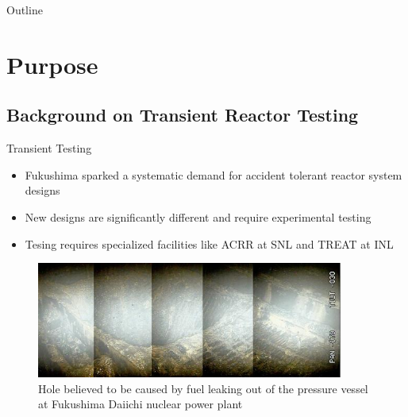 \documentclass[8pt,xcolor=dvipnames]{beamer}
\begin{document}
\begin{frame}{Outline}
\begin{multicols}{2}
\tableofcontents 
\end{multicols}
\end{frame}

\section{Purpose}

\subsection{Background on Transient Reactor Testing}

\begin{frame}{Transient Testing}

\begin{block}{}
\begin{itemize}
\item Fukushima sparked a systematic demand for accident tolerant reactor system designs
\item New designs are significantly different and require experimental testing 
\item Tesing requires specialized facilities like ACRR at SNL and TREAT at INL
\end{itemize}
\end{block}

\begin{figure}
\includegraphics[height=1.5in]{figures/fukushima_melt.jpg}
\caption{Hole believed to be caused by fuel leaking out of the pressure vessel at Fukushima Daiichi nuclear power plant}
\end{figure}

\end{frame}
\end{document}

